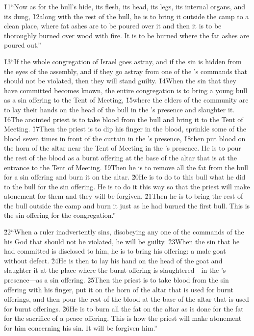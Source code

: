 \v{11}``Now as for the bull's hide, its flesh, its head, its legs, its internal organs, and its dung, \v{12}along with the rest of the bull, he is to bring it outside the camp to a clean place, where fat ashes are to be poured over it and then it is to be thoroughly burned over wood with fire. It is to be burned where the fat ashes are poured out.''

\v{13}``If the whole congregation of Israel goes astray, and if the sin is hidden from the eyes of the assembly, and if they go astray from one of the 's commands that should not be violated, then they will stand guilty. \v{14}When the sin that they have committed becomes known, the entire congregation is to bring a young bull as a sin offering to the Tent of Meeting, \v{15}where the elders of the community are to lay their hands on the head of the bull in the 's presence and slaughter it. \v{16}The anointed priest is to take blood from the bull and bring it to the Tent of Meeting. \v{17}Then the priest is to dip his finger in the blood, sprinkle some of the blood seven times in front of the curtain in the 's presence, \v{18}then put blood on the horn of the altar near the Tent of Meeting in the 's presence. He is to pour the rest of the blood as a burnt offering at the base of the altar that is at the entrance to the Tent of Meeting. \v{19}Then he is to remove all the fat from the bull for a sin offering and burn it on the altar. \v{20}He is to do to this bull what he did to the bull for the sin offering. He is to do it this way so that the priest will make atonement for them and they will be forgiven. \v{21}Then he is to bring the rest of the bull outside the camp and burn it just as he had burned the first bull. This is the sin offering for the congregation.''

\v{22}``When a ruler inadvertently sins, disobeying any one of the commands of the  his God that should not be violated, he will be guilty. \v{23}When the sin that he had committed is disclosed to him, he is to bring his offering: a male goat without defect. \v{24}He is then to lay his hand on the head of the goat and slaughter it at the place where the burnt offering is slaughtered---in the 's presence---as a sin offering. \v{25}Then the priest is to take blood from the sin offering with his finger, put it on the horn of the altar that is used for burnt offerings, and then pour the rest of the blood at the base of the altar that is used for burnt offerings. \v{26}He is to burn all the fat on the altar as is done for the fat for the sacrifice of a peace offering. This is how the priest will make atonement for him concerning his sin. It will be forgiven him.''

